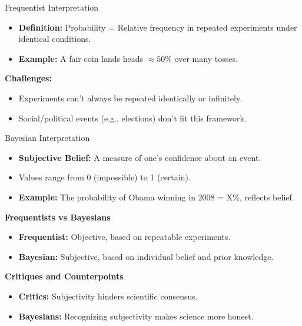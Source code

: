 \documentclass[aspectratio=169]{beamer}
\begin{document}
\begin{frame}{Frequentist Interpretation}
    \begin{itemize}
        \item \textbf{Definition:} Probability = Relative frequency in repeated experiments under identical conditions.
        \item \textbf{Example:} A fair coin lands heads $\approx 50\%$ over many tosses.
    \end{itemize}
    \vspace{0.5cm}
    \textbf{Challenges:}
    \begin{itemize}
        \item Experiments can’t always be repeated identically or infinitely.
        \item Social/political events (e.g., elections) don’t fit this framework.
    \end{itemize}
\end{frame}

\begin{frame}{Bayesian Interpretation}
    \begin{itemize}
        \item \textbf{Subjective Belief:} A measure of one's confidence about an event.
        \item Values range from 0 (impossible) to 1 (certain).
        \item \textbf{Example:} The probability of Obama winning in 2008 = X\%, reflects belief.
    \end{itemize}
    \vspace{0.3cm}

    \textbf{Frequentists vs Bayesians}
    \begin{itemize}
        \item \textbf{Frequentist:} Objective, based on repeatable experiments.
        \item \textbf{Bayesian:} Subjective, based on individual belief and prior knowledge.
    \end{itemize}
    \vspace{0.3cm}
    
    \textbf{Critiques and Counterpoints}
    \begin{itemize}
        \item \textbf{Critics:} Subjectivity hinders scientific consensus.
        \item \textbf{Bayesians:} Recognizing subjectivity makes science more honest.
    \end{itemize}

\end{frame}
\end{document}
